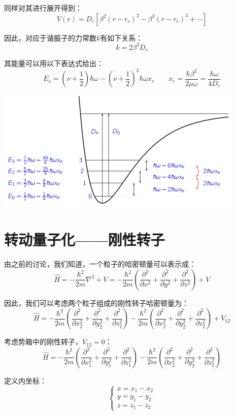 同样对其进行展开得到：
\[V(r)=D_e\left[\beta^2(r-r_e)^2-\beta^3(r-r_e)^3+\cdots\right]\]

因此，对应于谐振子的力常数$k$有如下关系：
\[k=2\beta^2D_e\]

其能量可以用以下表达式给出：
\[E_\nu=\left(\nu+\frac{1}{2}\right)\hbar\omega-\left(\nu+\frac{1}{2}\right)^2\hbar\omega x_e \qquad x_e=\frac{\hbar\beta^2}{2\mu\omega}=\frac{\hbar\omega}{4D_e}\]

\begin{center}
    \includegraphics[scale=0.7]{fig/lzhx/微信图片_20211104112141.png}
\end{center}

\section{转动量子化——刚性转子}
由之前的讨论，我们知道，一个粒子的哈密顿量可以表示成：
\[\hat{H}=-\frac{\hbar^2}{2m}\nabla^2 + V=-\frac{\hbar^2}{2m}\left ( \frac{\partial^2}{\partial x^2}+\frac{\partial^2}{\partial y^2}+\frac{\partial^2}{\partial z^2}\right ) + V\]

因此，我们可以考虑两个粒子组成的刚性转子哈密顿量为：
\[\hat{H}=-\frac{\hbar^2}{2m}\left ( \frac{\partial^2}{\partial x_2^2}+\frac{\partial^2}{\partial y_2^2}+\frac{\partial^2}{\partial z_2^2}\right ) -\frac{\hbar^2}{2m}\left ( \frac{\partial^2}{\partial x_2^2}+\frac{\partial^2}{\partial y_2^2}+\frac{\partial^2}{\partial z_2^2}\right ) + V_{12}\]

考虑势箱中的刚性转子，$V_{12}=0$：
\[\hat{H}=-\frac{\hbar^2}{2m}\left ( \frac{\partial^2}{\partial x_1^2}+\frac{\partial^2}{\partial y_1^2}+\frac{\partial^2}{\partial z_1^2}\right ) -\frac{\hbar^2}{2m}\left ( \frac{\partial^2}{\partial x_2^2}+\frac{\partial^2}{\partial y_2^2}+\frac{\partial^2}{\partial z_2^2}\right )\]

定义内坐标：
\[ \left \{
    \begin{array}{ll}
        x=x_1-x_2  \\
        y=y_1-y_2  \\
        z=z_1-z_2
    \end{array}
    \right .
\]

